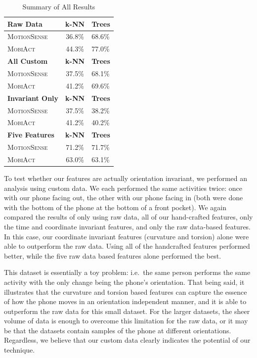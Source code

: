 \begin{table}[H]
\centering
\caption{Summary of All Results}
\begin{tabular}{lcl}
\toprule
\multicolumn{1}{l}{\textbf{Raw Data}} & \multicolumn{1}{c}{\textbf{k-NN}} & \multicolumn{1}{c}{\textbf{Trees}}  \\ \midrule
\textsc{MotionSense} & 36.8\% & 68.6\% \\
\textsc{MobiAct}     & 44.3\% & 77.0\% \\
\toprule 
\multicolumn{1}{l}{\textbf{All Custom}} & \multicolumn{1}{c}{\textbf{k-NN}} & \multicolumn{1}{c}{\textbf{Trees}}  \\ \midrule 
\textsc{MotionSense} & 37.5\% & 68.1\% \\
\textsc{MobiAct}     & 41.2\% & 69.6\% \\
\toprule 
\multicolumn{1}{l}{\textbf{Invariant Only}} & \multicolumn{1}{c}{\textbf{k-NN}} & \multicolumn{1}{c}{\textbf{Trees}}  \\ \midrule
\textsc{MotionSense} & 37.5\% & 38.2\% \\
\textsc{MobiAct}     & 41.2\% & 40.2\% \\
\toprule 
\multicolumn{1}{l}{\textbf{Five Features}} & \multicolumn{1}{c}{\textbf{k-NN}} & \multicolumn{1}{c}{\textbf{Trees}}  \\ \midrule
\textsc{MotionSense} & 71.2\% & 71.7\% \\
\textsc{MobiAct}     & 63.0\% & 63.1\% \\
\bottomrule
\end{tabular}
\label{tab:all_results_ms_ma}
\end{table}

To test whether our features are actually orientation invariant, we performed an analysis using custom data. We each performed the same activities twice: once with our phone facing out, the other with our phone facing in (both were done with the bottom of the phone at the bottom of a front pocket). We again compared the results of only using raw data, all of our hand-crafted features, only the time and coordinate invariant features, and only the raw data-based features. In this case, our coordinate invariant features (curvature and torsion) alone were able to outperform the raw data. Using all of the handcrafted features performed better, while the five raw data based features alone performed the best. 

This dataset is essentially a toy problem: i.e.\ the same person performs the same activity with the only change being the phone's orientation. That being said, it illustrates that the curvature and torsion based features can capture the essence of how the phone moves in an orientation independent manner, and it is able to outperform the raw data for this small dataset. For the larger datasets, the sheer volume of data is enough to overcome this limitation for the raw data, or it may be that the datasets contain samples of the phone at different orientations. Regardless, we believe that our custom data clearly indicates the potential of our technique.

